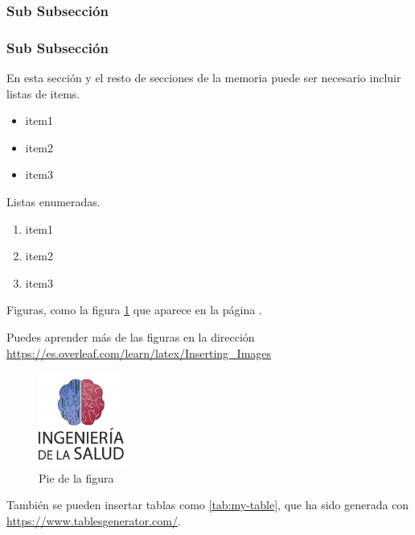 \subsubsection{Sub Subsección}

\subsubsection{Sub Subsección}

En esta sección y el resto de secciones de la memoria puede ser necesario incluir listas de items.

\begin{itemize}
    \item item1
    \item item2
    \item item3
\end{itemize}

Listas enumeradas.
\begin{enumerate}
    \item item1
    \item item2
    \item item3
\end{enumerate}

Figuras, como la figura \ref{fig:escudo} que aparece en la página \pageref{fig:escudo}. 

Puedes aprender más de las figuras en la dirección \url{https://es.overleaf.com/learn/latex/Inserting_Images} %

\begin{figure}[h]
    \centering
    \includegraphics[width=0.25\textwidth]{img/escudoSalud.pdf}
    \caption{Pie de la figura}
    \label{fig:escudo} %
\end{figure}


También se pueden insertar tablas como \ref{tab:my-table}, que ha sido generada con \url{https://www.tablesgenerator.com/}. %

